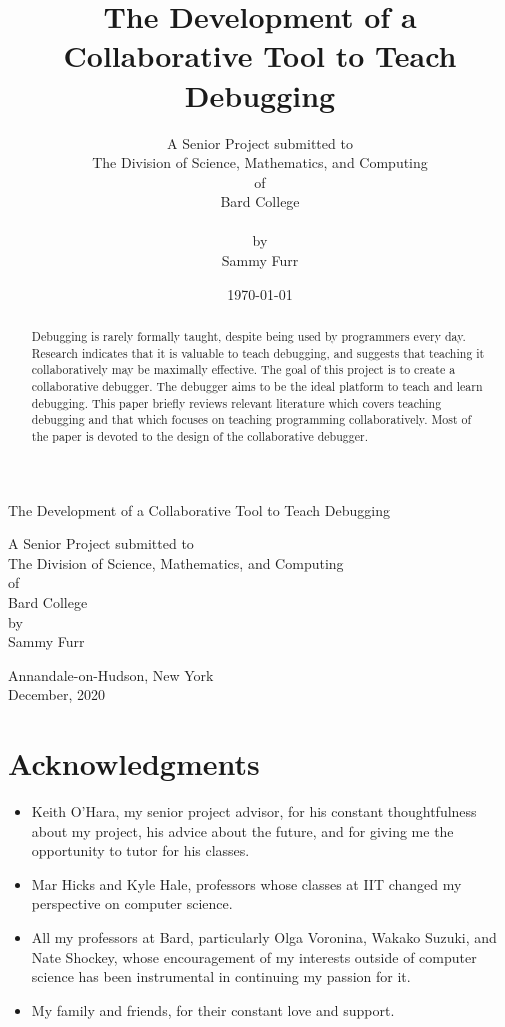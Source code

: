 \documentclass[12pt]{article}
\author{A Senior Project submitted to\\The Division of Science, Mathematics, and Computing\\of\\Bard College\\\\by\\Sammy Furr}
\title{The Development of a Collaborative Tool to Teach Debugging}
\date{\today}
\begin{document}
\begin{titlepage}
  \linespread{1}
    \begin{center}
            
        \Huge
        The Development of a Collaborative Tool to Teach Debugging
        
        \vspace{4cm}
       
        \large
        A Senior Project submitted to\\
        The Division of Science, Mathematics, and Computing\\
        of\\
        Bard College\\
        \vspace{1cm}
        by\\
        Sammy Furr
        \vfill
            
        Annandale-on-Hudson, New York\\
        December, 2020
    \end{center}
\end{titlepage}

\begin{abstract}
  \linespread{1}
  Debugging is rarely formally taught, despite being used by
  programmers every day.  Research indicates that it is valuable to
  teach debugging, and suggests that teaching it collaboratively may
  be maximally effective.  The goal of this project is to create a
  collaborative debugger.  The debugger aims to be the ideal platform
  to teach and learn debugging.  This paper briefly reviews relevant
  literature which covers teaching debugging and that which focuses on
  teaching programming collaboratively.  Most of the paper is devoted
  to the design of the collaborative debugger.
\end{abstract}

\section{Acknowledgments}

\begin{itemize}
\item Keith O'Hara, my senior project advisor, for his constant
  thoughtfulness about my project, his advice about the future, and
  for giving me the opportunity to tutor for his classes.
\item Mar Hicks and Kyle Hale, professors whose classes at IIT changed
  my perspective on computer science.
\item All my professors at Bard, particularly Olga Voronina, Wakako
  Suzuki, and Nate Shockey, whose encouragement of my interests
  outside of computer science has been instrumental in continuing my
  passion for it.
\item My family and friends, for their constant love and support.
\end{itemize}
\end{document}
